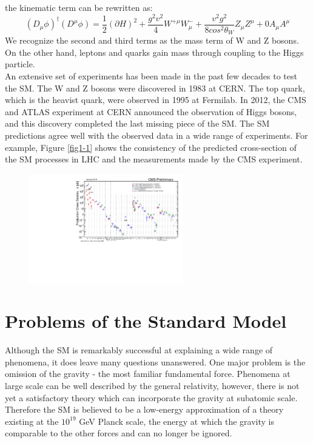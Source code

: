 \documentclass[thesis.tex]{subfiles}
\begin{document}
the kinematic term can be rewritten as:
	\begin{equation}
		(D_\mu \phi)^\dagger(D^\mu\phi) = \frac{1}{2}(\partial H)^2 + \frac{g^2v^2}{4}W^{+\mu}W_{\mu}^- + \frac{v^2g^2}{8cos^2\theta_W}Z_\mu Z^\mu + 0A_\mu A^\mu
	\end{equation}
We recognize the second and third terms as the mass term of W and Z bosons. On the other hand, leptons and quarks gain mass through coupling to the Higgs particle.  \\

An extensive set of experiments has been made in the past few decades to test the SM. 
The W and Z bosons were discovered in 1983 at CERN. The top quark, which is the heavist quark, were observed in 1995 at Fermilab. 
In 2012, the CMS and ATLAS experiment at CERN announced the observation of Higgs bosons, and this discovery completed the last missing piece of the SM.  
The SM predictions agree well with the observed data in a wide range of experiments. 
For example, Figure \ref{fig1-1} shows the consistency of the predicted cross-section of the SM processes in LHC and the measurements made by the CMS experiment.
	\begin{figure}[hbtp]
		\centering
	\includegraphics[width=0.6\textwidth]{plot/SigmaNew_v0.pdf}
	\end{figure}
	

\section{Problems of the Standard Model}
Although the SM is remarkably successful at explaining a wide range of phenomena, it does leave many questions unanswered. 
One major problem is the omission of the gravity - the most familiar fundamental force. 
Phenomena at large scale can be well described by the general relativity, however, there is not yet a satisfactory theory which can incorporate the gravity at subatomic scale. 
Therefore the SM is believed to be a low-energy approximation of a theory existing at the $10^{19}$ GeV Planck scale, the energy at which the gravity is comparable to the other forces and can no longer be ignored.\\
\end{document}
